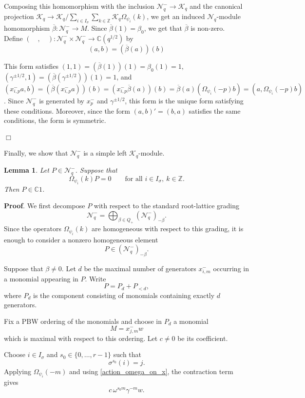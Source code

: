 \documentclass[12pt]{amsart}
\newtheorem{lem}[thm]{Lemma}
\numberwithin{equation}{section}
\newcommand{\dem }{\noindent\textbf{Proof}. }
\newcommand{\findem }{\hfill $\Box$ \vskip0.5cm }
\newcommand{\Z}{\ensuremath{\mathbb{Z}}}
\newcommand{\C}{\ensuremath{\mathbb{C}}}
\newcommand{\mc}[1]{\mathcal{#1}}
\begin{document}
Composing this homomorphism with the inclusion $\mc{N}_q^- \to \mc{K}_q$ and the canonical projection $\displaystyle \mc{K}_q \to \mc{K}_q/ \sum_{i\in I_\sigma}\sum_{k\in \Z} \mc{K}_q\Omega_{\psi_i}(k)$, we get an induced $\mc{N}_q$-module homomorphism $\overline{\beta} : \mc{N}_q^- \to M$. Since $\overline{\beta}(1)=\beta_0$, we get that $\overline{\beta}$ is non-zero.\\

Define $(\quad,\quad):\mc{N}_q^- \times \mc{N}_q^- \to \C(q^{1/2})$ by 
$$ (a,b) = (\overline{\beta}(a))(b) $$

This form satisfies $(1,1) = (\overline{\beta}(1))(1) = \beta_0(1)=1$, $(\gamma^{\pm 1/2},1)=(\overline{\beta}(\gamma^{\pm 1/2}))(1) = 1$, and $(x^-_{i,p}a,b) = (\overline{\beta}(x^-_{i,p}a))(b) = (x^-_{i,p}\overline{\beta}(a))(b) =  \overline{\beta}(a)(\Omega_{\psi_i}(-p)b)= (a,\Omega_{\psi_i}(-p)b)$. Since $\mc{N}_q^-$ is generated by $x^-_p$ and $\gamma^{\pm 1/2}$, this form is the unique form satisfying these conditions. Moreover, since the form $(a,b)'=(b,a)$ satisfies the same conditions, the form is symmetric.

\findem

Finally, we show that $\mc{N}_q^-$ is a simple left $\mc{K}_q$-module.

\begin{lem}\label{lem:Omega-invariant}
Let $P\in\mc N_q^-$. Suppose that
\[
\Omega_{\psi_i}(k)P=0
\qquad
\text{for all }i\in I_\sigma,\ k\in\mathbb Z.
\]
Then $P\in\mathbb C1$.
\end{lem}


\dem
We first decompose $P$ with respect to the standard root-lattice
grading
\[
\mc N_q^-=
\bigoplus_{\beta\in Q_+}
(\mc N_q^-)_{-\beta}.
\]
Since the operators $\Omega_{\psi_i}(k)$ are homogeneous with
respect to this grading, it is enough to consider a nonzero
homogeneous element
\[
P\in(\mc N_q^-)_{-\beta}.
\]

Suppose that $\beta\neq0$. Let $d$ be the maximal number of
generators $x^-_{i,m}$ occurring in a monomial appearing in $P$.
Write
\[
P=P_d+P_{<d},
\]
where $P_d$ is the component consisting of monomials containing
exactly $d$ generators.

Fix a PBW ordering of the monomials and choose in $P_d$ a monomial
\[
M=x^-_{j,m}w
\]
which is maximal with respect to this ordering. Let $c\neq0$ be its
coefficient.

Choose $i\in I_\sigma$ and $s_0\in\{0,\ldots,r-1\}$ such that
\[
\sigma^{s_0}(i)=j.
\]
Applying $\Omega_{\psi_i}(-m)$ and using
\eqref{action_omega_on_x}, the contraction term gives
\[
c\,\omega^{s_0m}\gamma^{-m}w.
\]
\end{document}

